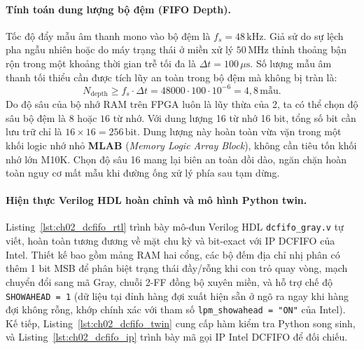 \paragraph{Tính toán dung lượng bộ đệm (FIFO Depth).}
Tốc độ đẩy mẫu âm thanh mono vào bộ đệm là $f_s = 48\,\text{kHz}$. Giả sử do sự lệch pha ngẫu nhiên hoặc do máy trạng thái ở miền xử lý $50\,\text{MHz}$ thỉnh thoảng bận rộn trong một khoảng thời gian trễ tối đa là $\Delta t = 100\,\mu\mathrm{s}$. Số lượng mẫu âm thanh tối thiểu cần được tích lũy an toàn trong bộ đệm mà không bị tràn là:
\begin{equation}
N_{\mathrm{depth}} \ge f_s\cdot \Delta t = 48000\cdot 100\cdot 10^{-6} = 4{,}8\,\text{mẫu}.
\end{equation}
Do độ sâu của bộ nhớ RAM trên FPGA luôn là lũy thừa của 2, ta có thể chọn độ sâu bộ đệm là $8$ hoặc $16$ từ nhớ. Với dung lượng 16 từ nhớ 16 bit, tổng số bit cần lưu trữ chỉ là $16 \times 16 = 256\,\text{bit}$. Dung lượng này hoàn toàn vừa vặn trong một khối logic nhớ nhỏ \textbf{MLAB} (\emph{Memory Logic Array Block}), không cần tiêu tốn khối nhớ lớn M10K. Chọn độ sâu 16 mang lại biên an toàn dồi dào, ngăn chặn hoàn toàn nguy cơ mất mẫu khi đường ống xử lý phía sau tạm dừng.

\paragraph{Hiện thực Verilog HDL hoàn chỉnh và mô hình Python twin.}
Listing~\ref{lst:ch02_dcfifo_rtl} trình bày mô-đun Verilog HDL \texttt{dcfifo\_gray.v} tự viết, hoàn toàn tương đương về mặt chu kỳ và bit-exact với IP DCFIFO của Intel. Thiết kế bao gồm mảng RAM hai cổng, các bộ đếm địa chỉ nhị phân có thêm 1 bit MSB để phân biệt trạng thái đầy/rỗng khi con trỏ quay vòng, mạch chuyển đổi sang mã Gray, chuỗi 2-FF đồng bộ xuyên miền, và hỗ trợ chế độ \texttt{SHOWAHEAD = 1} (dữ liệu tại đỉnh hàng đợi xuất hiện sẵn ở ngõ ra ngay khi hàng đợi không rỗng, khớp chính xác với tham số \texttt{lpm\_showahead = "ON"} của Intel). Kế tiếp, Listing~\ref{lst:ch02_dcfifo_twin} cung cấp hàm kiểm tra Python song sinh, và Listing~\ref{lst:ch02_dcfifo_ip} trình bày mã gọi IP Intel DCFIFO để đối chiếu.

